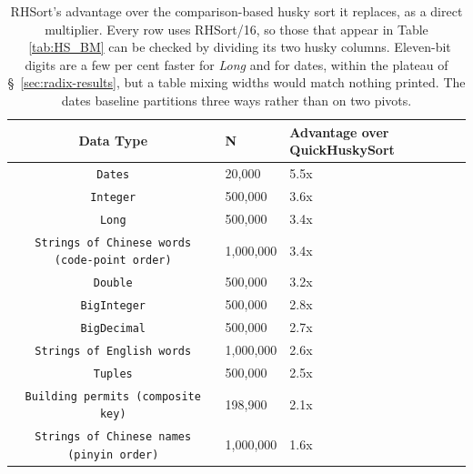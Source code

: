 \documentclass[twoside,leqno,twocolumn]{article}
\begin{document}
\begin{table}
  \caption{RHSort's advantage over the comparison-based husky sort it replaces, as a direct
    multiplier. Every row uses RHSort/16, so those that appear in Table ~\ref{tab:HS_BM} can be
    checked by dividing its two husky columns. Eleven-bit digits are a few per cent faster for
    \textit{Long} and for dates, within the plateau of \S~\ref{sec:radix-results}, but a table
    mixing widths would match nothing printed. The dates baseline partitions three ways rather than
    on two pivots.}
  \label{tab:RadixImprovements}
  \centering
  \begin{tabular}{cll}
    \toprule
    Data Type & N & Advantage over QuickHuskySort \\
    \midrule
    \texttt{Dates} & 20,000 & 5.5x \\
    \texttt{Integer} & 500,000 & 3.6x \\
    \texttt{Long} & 500,000 & 3.4x \\
    \texttt{Strings of Chinese words (code-point order)} & 1,000,000 & 3.4x \\
    \texttt{Double} & 500,000 & 3.2x \\
    \texttt{BigInteger} & 500,000 & 2.8x \\
    \texttt{BigDecimal} & 500,000 & 2.7x \\
    \texttt{Strings of English words} & 1,000,000 & 2.6x \\
    \texttt{Tuples} & 500,000 & 2.5x \\
    \texttt{Building permits (composite key)} & 198,900 & 2.1x \\
    \texttt{Strings of Chinese names (pinyin order)} & 1,000,000 & 1.6x \\
    \bottomrule
  \end{tabular}
\end{table}
\end{document}
